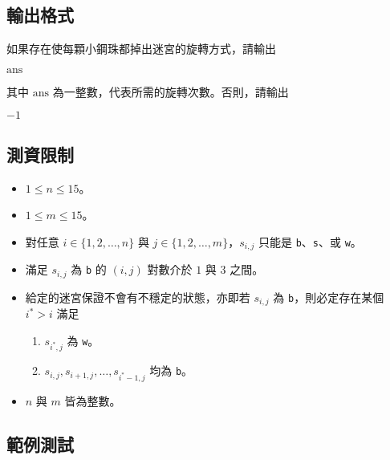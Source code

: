 \subsection{輸出格式}

如果存在使每顆小鋼珠都掉出迷宮的旋轉方式，請輸出

\begin{format}
\f{
$\textrm{ans}$
}
\end{format}

\noindent 其中 \(\textrm{ans}\)
為一整數，代表所需的旋轉次數。否則，請輸出

\begin{format}
\f{
$-1$
}
\end{format}

\subsection{測資限制}

\begin{itemize}
\tightlist
\item
  \(1 \le n \le 15\)。
\item
  \(1 \le m \le 15\)。
\item
  對任意 \(i \in \{1, 2, \ldots, n\}\) 與
  \(j \in \{1, 2, \ldots, m\}\)，\(s_{i, j}\) 只能是
  \texttt{b}、\texttt{s}、或 \texttt{w}。
\item
  滿足 \(s_{i, j}\) 為 \texttt{b} 的 \((i, j)\) 對數介於 \(1\) 與 \(3\)
  之間。
\item
  給定的迷宮保證不會有不穩定的狀態，亦即若 \(s_{i, j}\) 為
  \texttt{b}，則必定存在某個 \(i^* > i\) 滿足

  \begin{enumerate}
  \def\labelenumi{\arabic{enumi}.}
  \tightlist
  \item
    \(s_{i^*, j}\) 為 \texttt{w}。
  \item
    \(s_{i, j}, s_{i+1, j}, \ldots, s_{i^*-1, j}\) 均為 \texttt{b}。
  \end{enumerate}
\item
  \(n\) 與 \(m\) 皆為整數。
\end{itemize}

\subsection{範例測試}

\begin{example}
%
%
%
\end{example}

